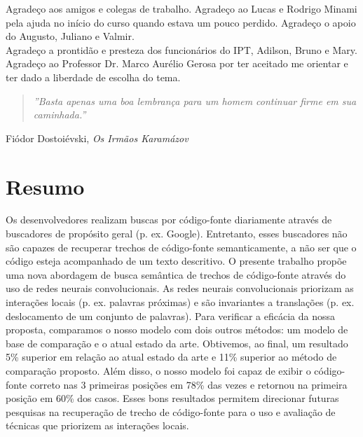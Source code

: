 \documentclass[12pt,twoside,a4paper]{book} %
\begin{document}
Agradeço aos amigos e colegas de trabalho. Agradeço ao Lucas e Rodrigo Minami pela ajuda no início do curso quando estava um pouco perdido. Agradeço o apoio do Augusto, Juliano e Valmir.
\\

Agradeço a prontidão e presteza dos funcionários do IPT, Adilson, Bruno e Mary.
\\

Agradeço ao Professor Dr. Marco Aurélio Gerosa por ter aceitado me orientar e ter dado a liberdade de escolha do tema. 

\newpage
\thispagestyle{empty}

\begin{center}
        \vspace*{18 cm}
        \begin{quote}
            \textit{''Basta apenas uma boa lembrança para um homem continuar firme em sua caminhada.''}
        \end{quote}
        \begin{flushright}
        Fiódor Dostoiévski, \textit{Os Irmãos Karamázov}\\
        \end{flushright}
    \end{center}


\pagebreak
\chapter*{Resumo}

Os desenvolvedores realizam buscas por código-fonte diariamente através de buscadores de propósito geral (p. ex. Google). Entretanto, esses buscadores não são capazes de recuperar trechos de código-fonte semanticamente, a não ser que o código esteja acompanhado de um texto descritivo. O presente trabalho propõe uma nova abordagem de busca semântica de trechos de código-fonte através do uso de redes neurais convolucionais. As redes neurais convolucionais priorizam as interações locais (p. ex. palavras próximas) e são invariantes a translações (p. ex. deslocamento de um conjunto de palavras). Para verificar a eficácia da nossa proposta, comparamos o nosso modelo com dois outros métodos: um modelo de base de comparação e o atual estado da arte. Obtivemos, ao final, um resultado 5\% superior em relação ao atual estado da arte e 11\% superior ao método de comparação proposto. Além disso, o nosso modelo foi capaz de exibir o código-fonte correto nas 3 primeiras posições em 78\% das vezes e retornou na primeira posição em 60\% dos casos. Esses bons resultados permitem direcionar futuras pesquisas na recuperação de trecho de código-fonte para o uso e avaliação de técnicas que priorizem as interações locais.
\\
\end{document}
